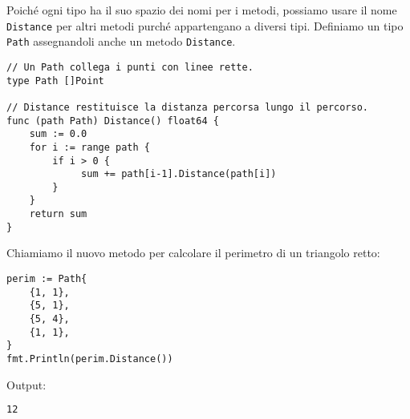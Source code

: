 Poiché ogni tipo ha il suo spazio dei nomi per i metodi, possiamo usare il nome \verb|Distance| per altri metodi purché appartengano a diversi tipi.
Definiamo un tipo \verb|Path| assegnandoli anche un metodo \verb|Distance|.
\begin{lstlisting}[frame=single, label={lst:lstlisting5-1.4}]
// Un Path collega i punti con linee rette.
type Path []Point

// Distance restituisce la distanza percorsa lungo il percorso.
func (path Path) Distance() float64 {
    sum := 0.0
    for i := range path {
        if i > 0 {
             sum += path[i-1].Distance(path[i])
        }
    }
    return sum
}
\end{lstlisting}
Chiamiamo il nuovo metodo per calcolare il perimetro di un triangolo retto:
\begin{lstlisting}[frame=single, label={lst:lstlisting5-1.5}]
perim := Path{
    {1, 1},
    {5, 1},
    {5, 4},
    {1, 1},
}
fmt.Println(perim.Distance())
\end{lstlisting}
Output:
\begin{lstlisting}[language=bash, frame=L, label={lst:lstlisting5-1.6}]
12
\end{lstlisting}